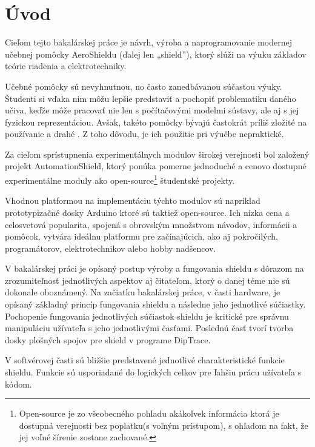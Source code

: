 \chapter*{Úvod}
\label{UVOD}



Cieľom tejto bakalárskej práce je návrh, výroba a naprogramovanie modernej učebnej pomôcky AeroShieldu (ďalej len „shield”), ktorý slúži na výuku základov teórie riadenia a elektrotechniky.

Učebné pomôcky sú nevyhnutnou, no často zanedbávanou súčasťou výuky. Študenti si vďaka nim môžu lepšie predstaviť a pochopiť problematiku daného učiva, keďže môže pracovať nie len s počítačovými modelmi sústavy, ale aj s jej fyzickou reprezentáciou. 
Avšak, takéto pomôcky bývajú častokrát príliš zložité na používanie a drahé \cite{Hor}. Z toho dôvodu, je ich použitie pri výučbe nepraktické.

Za cieľom sprístupnenia experimentálnych modulov širokej verejnosti bol založený projekt AutomationShield, ktorý ponúka pomerne jednoduché a cenovo dostupné experimentálne moduly ako open-source\footnote[1]{Open-source je zo všeobecného pohľadu akákoľvek informácia ktorá je dostupná verejnosti bez poplatku(s voľným prístupom), s ohľadom na fakt, že jej voľné šírenie zostane zachované.} študentské projekty.

Vhodnou platformou na implementáciu týchto modulov sú napríklad prototypizačné dosky Arduino ktoré sú taktiež open-source. Ich nízka cena a celosvetová popularita, spojená s obrovským množstvom návodov, informácii a pomôcok, vytvára ideálnu platformu pre začínajúcich, ako aj pokročilých, programátorov, elektrotechnikov alebo hobby nadšencov.

V bakalárskej práci je opísaný postup výroby a fungovania shieldu s dôrazom na zrozumiteľnosť jednotlivých aspektov aj čitateľom, ktorý o danej téme nie sú dokonale oboznámený. Na začiatku bakalárskej práce, v časti hardware, je opísaný základný princíp fungovania shieldu a následne jeho jednotlivé súčiastky. Pochopenie fungovania jednotlivých súčiastok shieldu je kritické pre správnu manipuláciu užívateľa s jeho jednotlivými časťami. Poslednú časť tvorí tvorba dosky plošných spojov pre shield v programe DipTrace.

V softvérovej časti sú bližšie predstavené jednotlivé charakteristické funkcie shieldu. Funkcie sú usporiadané do logických celkov pre ľahšiu prácu užívateľa s kódom.

